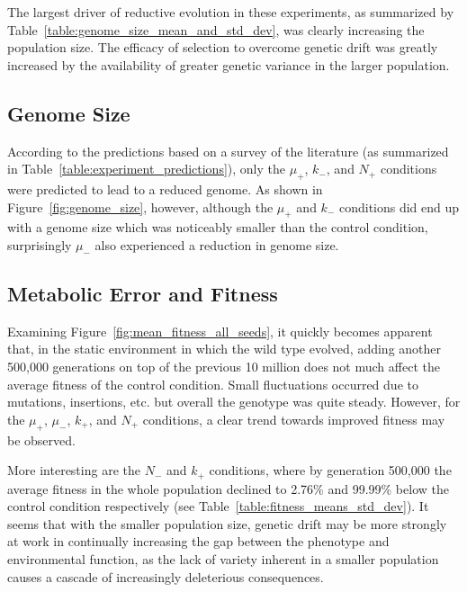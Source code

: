 The largest driver of reductive evolution in these experiments, as summarized by Table~\ref{table:genome_size_mean_and_std_dev}, was clearly increasing the population size. The efficacy of selection to overcome genetic drift was greatly increased by the availability of greater genetic variance in the larger population. 

\subsection{Genome Size}

According to the predictions based on a survey of the literature (as summarized in Table~\ref{table:experiment_predictions}), only the $\mu_+$, $k_-$, and $N_+$ conditions were predicted to lead to a reduced genome. As shown in Figure~\ref{fig:genome_size}, however, although the $\mu_+$ and $k_-$ conditions did end up with a genome size which was noticeably smaller than the control condition, surprisingly $\mu_-$ also experienced a reduction in genome size. 



\subsection{Metabolic Error and Fitness}
Examining Figure~\ref{fig:mean_fitness_all_seeds}, it quickly becomes apparent that, in the static environment in which the wild type evolved, adding another 500,000 generations on top of the previous 10 million does not much affect the average fitness of the control condition. Small fluctuations occurred due to mutations, insertions, etc. but overall the genotype was quite steady. However, for the $\mu_+$, $\mu_-$, $k_+$, and $N_+$ conditions, a clear trend towards improved fitness may be observed.

More interesting are the $N_-$ and $k_+$ conditions, where by generation 500,000 the average fitness in the whole population declined to 2.76\% and 99.99\% below the control condition respectively (see Table~\ref{table:fitness_means_std_dev}). It seems that with the smaller population size, genetic drift may be more strongly at work in continually increasing the gap between the phenotype and environmental function, as the lack of variety inherent in a smaller population causes a cascade of increasingly deleterious consequences.
 

